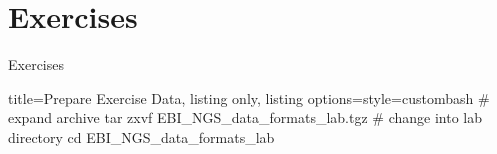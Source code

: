 \documentclass{beamer}
\begin{document}


\section{Exercises}

\begin{frame}[fragile]{Exercises}
\begin{tcblisting}{title={Prepare Exercise Data}, listing only, listing options={style=custombash}}
# expand archive
tar zxvf EBI_NGS_data_formats_lab.tgz
# change into lab directory
cd EBI_NGS_data_formats_lab
\end{tcblisting}
\end{frame}


\end{document}
